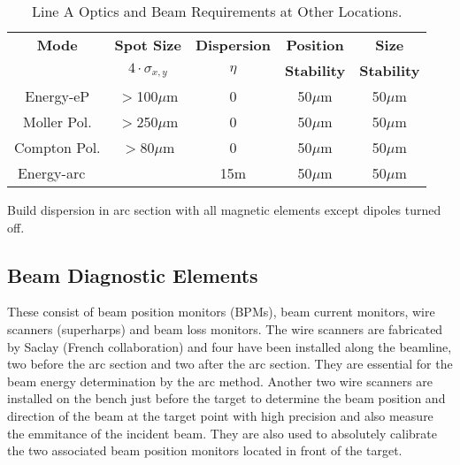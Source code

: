 {
\setcounter{footnotetmp1}{\value{footnote}}
\setcounter{footnotetmp2}{\value{footnotetmp1}}
\begin{table}[h]
\begin{center}
\begin{tabular}{|c|c|c|c|c|} \hline
{\bf Mode} & {\bf Spot Size} & {\bf Dispersion} & {\bf Position} & {\bf Size} \\
& {\bf $4\cdot{}\sigma_{x,y}$} & {\bf $\eta$} & {\bf Stability} & {\bf Stability} \\ \hline
Energy-eP  {\color{red}} & $>$100$\mu$m & 0 & 50$\mu$m & 50$\mu$m \\ \hline
Moller Pol.{\color{red}} & $>$250$\mu$m & 0 & 50$\mu$m & 50$\mu$m \\ \hline
Compton Pol.  & $>$80$\mu$m & 0 & 50$\mu$m & 50$\mu$m \\ \hline
Energy-arc {\color{red}~} && 15m & 50$\mu$m & 50$\mu$m \\ \hline
\end{tabular}
\end{center}
\caption[Beamline: Optics Requirements Other]{ Line A Optics and
         Beam Requirements at Other Locations.
}
\label{beam_tab4}
\end{table}
\addtocounter{footnote}{2}
\footnotetext[\value{footnotetmp1}]{Destructive measurements.}
\footnotetext[\value{footnotetmp2}]{Build dispersion in arc section with all 
             magnetic elements except dipoles turned off.}

Build dispersion in arc section with all magnetic elements except
dipoles turned off.

\subsection{Beam Diagnostic Elements}

These consist of beam position monitors (BPMs), beam current monitors,  wire 
scanners (superharps) and beam loss monitors. 
The wire scanners are fabricated by Saclay (French 
collaboration) and four have been installed along the beamline, two before 
the arc section and two after the arc section. They are essential for the 
beam energy determination by the arc method. Another two wire scanners are
installed on the bench just before the target to determine the beam 
position and direction of the beam at the target point with high precision 
and also measure the emmitance of the incident beam. They are also used to  
absolutely calibrate the two associated beam position monitors located  in 
front of the target. 

}
